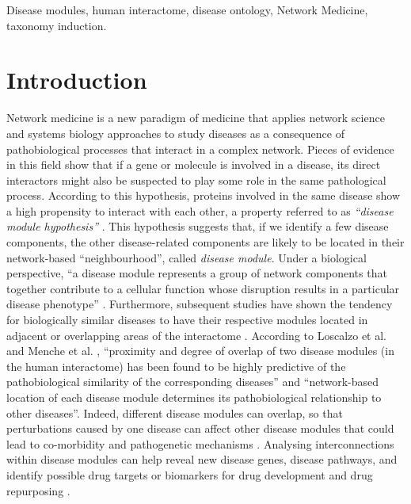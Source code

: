 \documentclass[journal,twoside,web]{ieeecolor}
\begin{document}
\begin{IEEEkeywords}
Disease modules, human interactome, disease ontology, Network Medicine,  taxonomy induction.
\end{IEEEkeywords}
\vspace{-9pt}
\section{Introduction}
\label{sec:introduction}
Network medicine is a new paradigm of medicine that applies network science and systems biology approaches to study diseases as a consequence of pathobiological processes that interact in a complex network.  Pieces of evidence in this field show that if a gene or molecule is involved in a disease, its direct interactors might also be suspected to play some role in the same pathological process. According to this hypothesis, proteins involved in the same disease show a high propensity to interact with each other, a property referred to as \textit{ ``disease module hypothesis''} \cite{networkmedicine, menche2015uncovering}. This  hypothesis suggests that, if we identify a few disease components, the other disease-related components are likely to be located in their network-based ``neighbourhood'', called  \textit{disease module}. Under a biological perspective, ``a disease module represents a group of
network components that together contribute to a cellular function whose disruption results
in a particular disease phenotype'' \cite{networkmedicine}. 
Furthermore, subsequent studies have shown the tendency for biologically similar diseases to have their respective  modules located in adjacent or overlapping areas of the interactome \cite{menche2015uncovering, goh2007human, booknetwork}. 
According to Loscalzo et al. \cite{booknetwork} and Menche et al. \cite{menche2015uncovering}, ``proximity and degree of overlap of two disease modules (in the human interactome) has been found to be highly predictive of the pathobiological similarity of the corresponding diseases'' and ``network-based location of each disease module determines its pathobiological relationship to other diseases''. Indeed, different disease modules can overlap, so that perturbations caused by one disease can affect other disease modules that could lead to co-morbidity and pathogenetic mechanisms \cite{networkmedicine}. Analysing  interconnections within  disease modules can help reveal new disease genes, disease pathways, and identify possible drug targets or biomarkers for drug development and drug repurposing \cite{cheng2019network, networkmedicine}.
\end{document}
